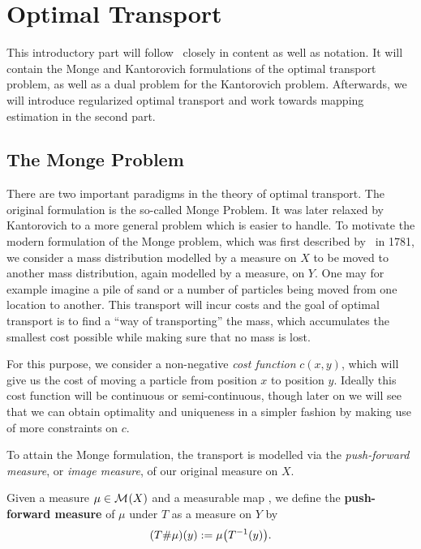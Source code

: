 \chapter{Optimal Transport}\label{OT}

This introductory part will follow\ \cite[Chapter~1]{San2015} closely in content as well as notation. It will contain the Monge and Kantorovich formulations of the optimal transport problem, as well as a dual problem for the Kantorovich problem. Afterwards, we will introduce regularized optimal transport and work towards mapping estimation in the second part.

\section{The Monge Problem}\label{TheMonProb}
There are two important paradigms in the theory of optimal transport. The original formulation is the so-called Monge Problem. It was later relaxed by Kantorovich to a more general problem which is easier to handle. To motivate the modern formulation of the Monge problem, which was first described by\ \cite{Mon1781} in 1781, we consider a mass distribution modelled by a measure on $X$ to be moved to another mass distribution, again modelled by a measure, on $Y$. One may for example imagine a pile of sand or a number of particles being moved from one location to another. This transport will incur costs and the goal of optimal transport is to find a ``way of transporting'' the mass, which accumulates the smallest cost possible while making sure that no mass is lost.

For this purpose, we consider a non-negative \textit{cost function} $c(x, y)$, which will give us the cost of moving a particle from position $x$ to position $y$. Ideally this cost function will be continuous or semi-continuous, though later on we will see that we can obtain optimality and uniqueness in a simpler fashion by making use of more constraints on $c$.

To attain the Monge formulation, the transport is modelled via the \textit{push-forward measure}, or \textit{image measure}, of our original measure on $X$.

\begin{definition}\label{PushForward}
	Given a measure $\mu \in \mathcal{M}_{}(X)$ and a measurable map , we define the \textbf{push-forward measure} of $\mu$ under $T$ as a measure on $Y$ by
	\[ ({T} \# \mu)(y) := \mu\big( T^{-1} (y) \big). \]
\end{definition}

